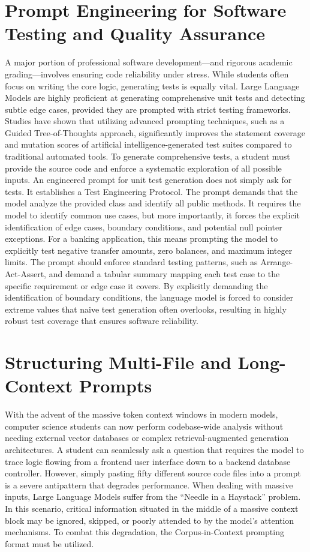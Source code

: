 \documentclass[12pt]{article}
\begin{document}
\section{Prompt Engineering for Software Testing and Quality Assurance}
A major portion of professional software development---and rigorous academic
grading---involves ensuring code reliability under stress. While students often focus on writing the core
logic, generating tests is equally vital. Large Language Models are highly proficient at generating
comprehensive unit tests and detecting subtle edge cases, provided they are prompted with strict testing
frameworks. Studies have shown that utilizing advanced prompting techniques, such as a Guided Tree-of-Thoughts
approach, significantly improves the statement coverage and mutation scores of artificial
intelligence-generated test suites compared to traditional automated tools. To generate comprehensive tests, a
student must provide the source code and enforce a systematic exploration of all possible inputs. An engineered
prompt for unit test generation does not simply ask for tests. It establishes a Test Engineering Protocol. The
prompt demands that the model analyze the provided class and identify all public methods. It requires the model
to identify common use cases, but more importantly, it forces the explicit identification of edge cases,
boundary conditions, and potential null pointer exceptions. For a banking application, this means prompting the
model to explicitly test negative transfer amounts, zero balances, and maximum integer limits. The prompt
should enforce standard testing patterns, such as Arrange-Act-Assert, and demand a tabular summary mapping each
test case to the specific requirement or edge case it covers. By explicitly demanding the identification of
boundary conditions, the language model is forced to consider extreme values that naive test generation often
overlooks, resulting in highly robust test coverage that ensures software reliability.

\section{Structuring Multi-File and Long-Context Prompts}
With the advent of the massive token context windows in modern models,
computer science students can now perform codebase-wide analysis without needing external vector databases or
complex retrieval-augmented generation architectures. A student can seamlessly ask a question that requires the
model to trace logic flowing from a frontend user interface down to a backend database controller. However,
simply pasting fifty different source code files into a prompt is a severe antipattern that degrades
performance. When dealing with massive inputs, Large Language Models suffer from the ``Needle in a Haystack''
problem. In this scenario, critical information situated in the middle of a massive context block may be
ignored, skipped, or poorly attended to by the model's attention mechanisms. To combat this degradation, the
Corpus-in-Context prompting format must be utilized.
\end{document}
